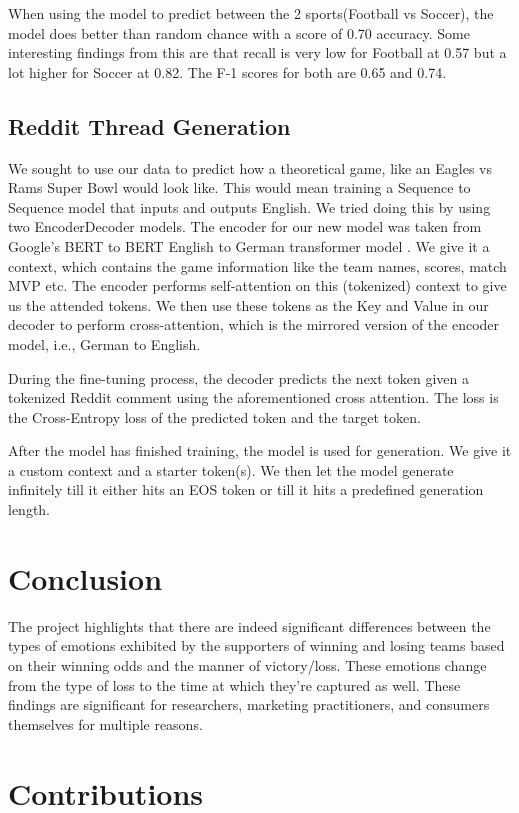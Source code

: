 \documentclass{article}
\begin{document}
When using the model to predict between the 2 sports(Football vs Soccer), the model does better than random chance with a score of 0.70 accuracy. Some interesting findings from this are that recall is very low for Football at 0.57 but a lot higher for Soccer at 0.82. The F-1 scores for both are 0.65 and 0.74.

\subsection{Reddit Thread Generation}
We sought to use our data to predict how a theoretical game, like an Eagles vs Rams Super Bowl would look like. This would mean training a Sequence to Sequence model that inputs and outputs English. We tried doing this by using two EncoderDecoder models. The encoder for our new model was taken from Google's BERT to BERT English to German transformer model \cite{DBLP:journals/corr/abs-1907-12461}. We give it a context, which contains the game information like the team names, scores, match MVP etc. The encoder performs self-attention on this (tokenized) context to give us the attended tokens. We then use these tokens as the Key and Value in our decoder to perform cross-attention, which is the mirrored version of the encoder model, i.e., German to English. 

During the fine-tuning process, the decoder predicts the next token given a tokenized Reddit comment using the aforementioned cross attention. The loss is the Cross-Entropy loss of the predicted token and the target token.

After the model has finished training, the model is used for generation. We give it a custom context and a starter token(s). We then let the model generate infinitely till it either hits an EOS token or till it hits a predefined generation length.

\section{Conclusion}
The project highlights that there are indeed significant differences between the types of emotions exhibited by the supporters of winning and losing teams based on their winning odds and the manner of victory/loss. These emotions change from the type of loss to the time at which they're captured as well. These findings are significant for researchers, marketing practitioners, and consumers themselves for multiple reasons. 
\section{Contributions}
\end{document}
